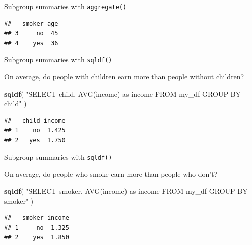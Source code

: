 \documentclass[ignorenonframetext,]{beamer}
\newenvironment{Shaded}{\begin{snugshade}}{\end{snugshade}}
\newcommand{\DataTypeTok}[1]{\textcolor[rgb]{0.13,0.29,0.53}{#1}}
\newcommand{\KeywordTok}[1]{\textcolor[rgb]{0.13,0.29,0.53}{\textbf{#1}}}
\newcommand{\NormalTok}[1]{#1}
\newcommand{\OperatorTok}[1]{\textcolor[rgb]{0.81,0.36,0.00}{\textbf{#1}}}
\newcommand{\StringTok}[1]{\textcolor[rgb]{0.31,0.60,0.02}{#1}}
\begin{document}
\begin{frame}[fragile]{Subgroup summaries with \texttt{aggregate()}}
\protect\hypertarget{subgroup-summaries-with-aggregate-24}{}

\begin{Shaded}
\end{Shaded}

\begin{verbatim}
##   smoker age
## 3     no  45
## 4    yes  36
\end{verbatim}

\end{frame}

\begin{frame}[fragile]{Subgroup summaries with \texttt{sqldf()}}
\protect\hypertarget{subgroup-summaries-with-sqldf}{}

On average, do people with children earn more than people without
children?

\begin{Shaded}
\begin{Highlighting}[]
\KeywordTok{sqldf}\NormalTok{(}
  \StringTok{"SELECT child, AVG(income) as income }
\StringTok{  FROM my_df}
\StringTok{  GROUP BY child"}
\NormalTok{)}
\end{Highlighting}
\end{Shaded}

\begin{verbatim}
##   child income
## 1    no  1.425
## 2   yes  1.750
\end{verbatim}

\end{frame}

\begin{frame}[fragile]{Subgroup summaries with \texttt{sqldf()}}
\protect\hypertarget{subgroup-summaries-with-sqldf-1}{}

On average, do people who smoke earn more than people who don't?

\begin{Shaded}
\begin{Highlighting}[]
\KeywordTok{sqldf}\NormalTok{(}
  \StringTok{"SELECT smoker, AVG(income) as income }
\StringTok{  FROM my_df}
\StringTok{  GROUP BY smoker"}
\NormalTok{)}
\end{Highlighting}
\end{Shaded}

\begin{verbatim}
##   smoker income
## 1     no  1.325
## 2    yes  1.850
\end{verbatim}

\end{frame}
\end{document}
